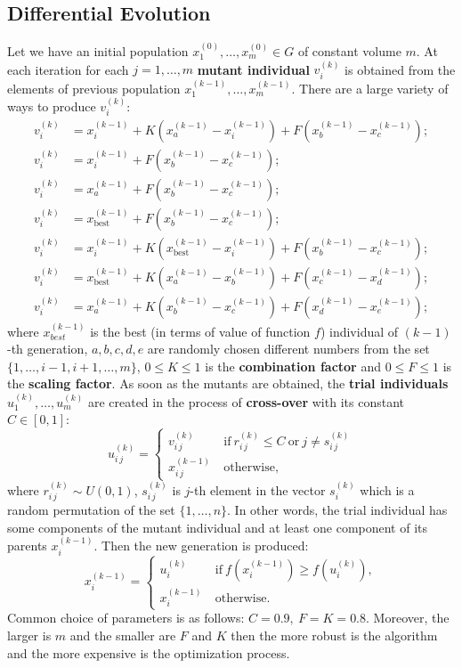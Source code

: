 \documentclass[12pt, bachelor, substylefile = algo_title.rtx]{disser}
\theoremstyle{definition}
\begin{document}
\subsection{Differential Evolution}
Let we have an initial population $x^{(0)}_1, \dots, x^{(0)}_m \in G$ of constant volume $m$. At each iteration for each $j = 1, \dots, m$ \textbf{mutant individual} $v^{(k)}_i$ is obtained from the elements of previous population $x^{(k-1)}_1, \dots, x^{(k-1)}_m$. There are a large variety of ways to produce $v^{(k)}_i$:
\begin{align}
\label{difev}
v^{(k)}_i & = x^{(k-1)}_i + K (x^{(k-1)}_a - x^{(k-1)}_i) + F(x^{(k-1)}_b - x^{(k-1)}_c);\\
v^{(k)}_i & = x^{(k-1)}_i + F(x^{(k-1)}_b - x^{(k-1)}_c);\\
v^{(k)}_i & = x^{(k-1)}_a + F(x^{(k-1)}_b - x^{(k-1)}_c);\\
v^{(k)}_i & = x^{(k-1)}_{\text{best}} + F(x^{(k-1)}_b - x^{(k-1)}_c);\\
v^{(k)}_i & = x^{(k-1)}_i + K (x^{(k-1)}_{\text{best}} - x^{(k-1)}_i) + F(x^{(k-1)}_b - x^{(k-1)}_c);\\
v^{(k)}_i & = x^{(k-1)}_{\text{best}} + K (x^{(k-1)}_a - x^{(k-1)}_b) + F(x^{(k-1)}_c - x^{(k-1)}_d);\\
v^{(k)}_i & = x^{(k-1)}_a+ K (x^{(k-1)}_b - x^{(k-1)}_c) + F(x^{(k-1)}_d - x^{(k-1)}_e);
\end{align}
where $x^{(k-1)}_{best}$ is the best (in terms of value of function $f$) individual of $(k-1)$-th generation, $a,b,c,d,e$ are randomly chosen different numbers from the set $\{1,\dots, i-1, i+1, \dots, m\}$, $0\le K \le 1$ is the \textbf{combination factor} and $0 \le F \le 1$ is the \textbf{scaling factor}. As soon as the mutants are obtained, the \textbf{trial individuals} $u^{(k)}_1, \dots, u^{(k)}_m$ are created in the process of \textbf{cross-over} with its constant $C \in [0, 1]$:
\[ u^{(k)}_{i\,j} = 
\begin{cases}
v^{(k)}_{i\,j} &\ \text{if}\ r^{(k)}_{i\,j} \le C\ \text{or}\ j  \ne s^{(k)}_{i\,j}\\
x^{(k-1)}_{i\,j} &\ \text{otherwise},
\end{cases}
 \]
where $r^{(k)}_{i\,j} \sim U(0, 1)$, $s^{(k)}_{i\,j}$ is $j$-th element in the vector $s^{(k)}_{i}$ which is a random permutation of the set $\{1, \dots, n\}$. In other words, the trial individual has some components of the mutant individual and at least one component of its parents $x^{(k-1)}_{i}$. 
Then the new generation is produced:
\[ x^{(k-1)}_{i} = 
\begin{cases}
u^{(k)}_{i} &\ \text{if}\ f( x^{(k-1)}_{i}) \ge  f(u^{(k)}_{i}),\\
x^{(k-1)}_{i} &\ \text{otherwise}.
\end{cases}
 \]
Common choice of parameters is as follows: $C = 0.9,\ F = K = 0.8$. Moreover, the larger is $m$ and the smaller are $F$ and $K$ then the more robust is the algorithm and the more expensive is the optimization process.
\end{document}
